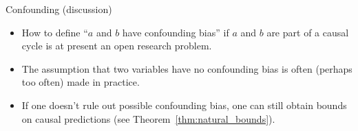 \begin{frame}{Confounding (discussion)}
\begin{itemize}
  \item How to define ``$a$ and $b$ have confounding bias'' if $a$ and $b$ are part of a causal cycle is at present an open research problem.
  \item The assumption that two variables have no confounding bias is often (perhaps too often) made in practice.
  \item If one doesn't rule out possible confounding bias, one can still obtain bounds on causal predictions (see Theorem~\ref{thm:natural_bounds}).
\end{itemize}
\end{frame}
